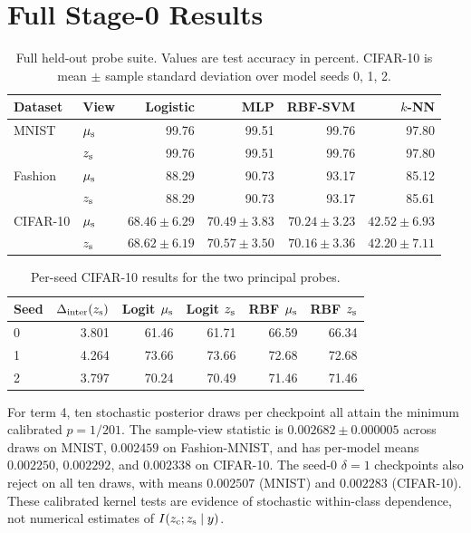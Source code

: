 \section{Full Stage-0 Results}
\label{app:full-results}

\begin{table}[ht]
\caption{Full held-out probe suite.  Values are test accuracy in percent.
CIFAR-10 is mean $\pm$ sample standard deviation over model seeds 0, 1, 2.}
\label{tab:full-probes}
\centering
\small
\begin{tabular}{llrrrr}
\toprule
Dataset & View & Logistic & MLP & RBF-SVM & $k$-NN \\
\midrule
MNIST & $\mu_{\mathrm{s}}$ & 99.76 & 99.51 & 99.76 & 97.80 \\
      & $z_{\mathrm{s}}$  & 99.76 & 99.51 & 99.76 & 97.80 \\
Fashion & $\mu_{\mathrm{s}}$ & 88.29 & 90.73 & 93.17 & 85.12 \\
        & $z_{\mathrm{s}}$  & 88.29 & 90.73 & 93.17 & 85.61 \\
CIFAR-10 & $\mu_{\mathrm{s}}$ & $68.46\pm6.29$ & $70.49\pm3.83$ &
$70.24\pm3.23$ & $42.52\pm6.93$ \\
         & $z_{\mathrm{s}}$ & $68.62\pm6.19$ & $70.57\pm3.50$ &
$70.16\pm3.36$ & $42.20\pm7.11$ \\
\bottomrule
\end{tabular}
\end{table}

\begin{table}[ht]
\caption{Per-seed CIFAR-10 results for the two principal probes.}
\label{tab:cifar-seeds}
\centering
\small
\begin{tabular}{lrrrrr}
\toprule
Seed & $\Delta_{\mathrm{inter}}(z_{\mathrm{s}})$ & Logit $\mu_{\mathrm{s}}$ & Logit $z_{\mathrm{s}}$ & RBF $\mu_{\mathrm{s}}$ & RBF $z_{\mathrm{s}}$ \\
\midrule
0 & 3.801 & 61.46 & 61.71 & 66.59 & 66.34 \\
1 & 4.264 & 73.66 & 73.66 & 72.68 & 72.68 \\
2 & 3.797 & 70.24 & 70.49 & 71.46 & 71.46 \\
\bottomrule
\end{tabular}
\end{table}

For term 4, ten stochastic posterior draws per checkpoint all attain the
minimum calibrated $p=1/201$.  The sample-view statistic is
$0.002682\pm0.000005$ across draws on MNIST, $0.002459$ on Fashion-MNIST,
and has per-model means $0.002250$, $0.002292$, and $0.002338$ on CIFAR-10.
The seed-0 $\delta=1$ checkpoints also reject on all ten draws, with means
$0.002507$ (MNIST) and $0.002283$ (CIFAR-10).  These calibrated kernel tests
are evidence of stochastic within-class dependence, not numerical estimates
of $I(z_{\mathrm{c}};z_{\mathrm{s}}\mid y)$.


